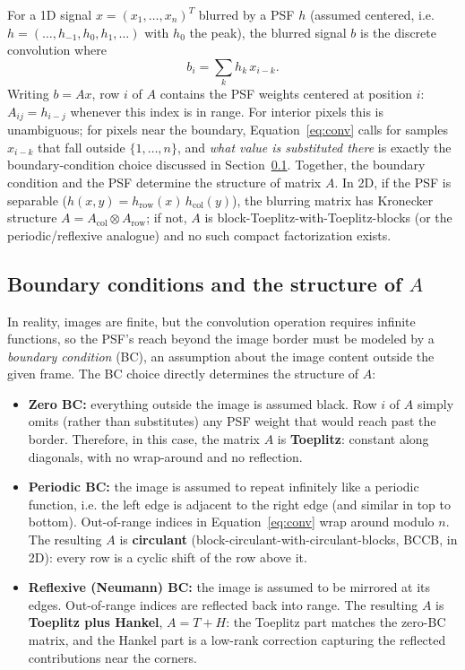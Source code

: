 \documentclass[12pt, a4paper, onecolumn]{article}
\theoremstyle{plain}          %
\theoremstyle{definition}     %
\theoremstyle{remark}
\begin{document}
For a 1D signal $x = (x_1,\dots,x_n)^T$ blurred by a PSF $h$ (assumed
centered, i.e.\ $h = (\dots,h_{-1},h_0,h_1,\dots)$ with $h_0$ the peak), the
blurred signal $b$ is the discrete convolution where
\begin{equation}
    b_i = \sum_k h_k\, x_{i-k}.
    \label{eq:conv}
\end{equation}
Writing $b = Ax$, row $i$ of $A$ contains the PSF weights centered at
position $i$: $A_{ij} = h_{i-j}$ whenever this index is in range. For
interior pixels this is unambiguous; for pixels near the boundary,
Equation~\eqref{eq:conv} calls for samples $x_{i-k}$ that fall outside
$\{1,\dots,n\}$, and \emph{what value is substituted there} is exactly the
boundary-condition choice discussed in Section~\ref{sec:bc}. Together, the boundary condition and the PSF determine the structure of matrix $A$. In 2D, if the
PSF is separable ($h(x,y) = h_{\text{row}}(x)\,h_{\text{col}}(y)$), the
blurring matrix has Kronecker structure $A = A_{\text{col}} \otimes
A_{\text{row}}$; if not, $A$ is block-Toeplitz-with-Toeplitz-blocks (or the
periodic/reflexive analogue) and no such compact factorization exists.

\subsection{Boundary conditions and the structure of $A$}
\label{sec:bc}

In reality, images are finite, but the convolution operation requires infinite functions, so the PSF's reach beyond the image border must be modeled by a \emph{boundary condition} (BC), an assumption about the image content outside the given frame. The BC choice directly determines the structure of $A$:

\begin{itemize}
    \item \textbf{Zero BC:} everything outside the image is assumed black. Row $i$ of $A$ simply omits (rather than substitutes) any PSF
    weight that would reach past the border. Therefore, in this case, the matrix $A$ is
    \textbf{Toeplitz}: constant along diagonals, with no wrap-around and no
    reflection.
    \item \textbf{Periodic BC:} the image is assumed to repeat infinitely like a periodic function, i.e. 
    the left edge is adjacent to the right edge (and similar in top to bottom).
    Out-of-range indices in Equation~\eqref{eq:conv} wrap around modulo
    $n$. The resulting $A$ is \textbf{circulant} (block-circulant-with-circulant-blocks,
    BCCB, in 2D): every row is a cyclic shift of the row above it.
    \item \textbf{Reflexive (Neumann) BC:} the image is assumed to be
    mirrored at its edges. Out-of-range indices are reflected back into
    range. The resulting $A$ is \textbf{Toeplitz plus Hankel},
    $A = T+H$: the Toeplitz part matches the zero-BC matrix, and the
    Hankel part is a low-rank correction capturing the reflected
    contributions near the corners.
\end{itemize}
\end{document}
